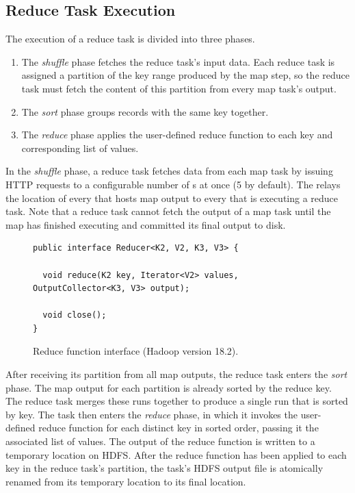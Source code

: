 \subsection{Reduce Task Execution}
\label{ch:hadoop:sec:reducetask}
The execution of a reduce task is divided into three phases.
\begin{enumerate}
\item The \emph{shuffle} phase fetches the reduce task's input
  data. Each reduce task is assigned a partition of the key range
  produced by the map step, so the reduce task must fetch the content
  of this partition from every map task's output.
\item The \emph{sort} phase groups records with the same key together.
\item The \emph{reduce} phase applies the user-defined reduce function
  to each key and corresponding list of values.
\end{enumerate}

In the \emph{shuffle} phase, a reduce task fetches data from each map task by
issuing HTTP requests to a configurable number of {\TT}s at once (5 by
default). The {\JT} relays the location of every {\TT} that hosts map output to
every {\TT} that is executing a reduce task. Note that a reduce task cannot
fetch the output of a map task until the map has finished executing and
committed its final output to disk.

\begin{figure}[t]
\ssp
\begin{minipage}{\linewidth}
\begin{verbatim}
public interface Reducer<K2, V2, K3, V3> {

  void reduce(K2 key, Iterator<V2> values, OutputCollector<K3, V3> output);

  void close();
}
\end{verbatim}

\end{minipage}
\caption{Reduce function interface (Hadoop version 18.2).}
\label{fig:reducefunction}
\end{figure}

After receiving its partition from all map outputs, the reduce task enters the
\emph{sort} phase. The map output for each partition is already sorted by the
reduce key. The reduce task merges these runs together to produce a single run
that is sorted by key. The task then enters the \emph{reduce} phase, in which it
invokes the user-defined reduce function for each distinct key in sorted order,
passing it the associated list of values. The output of the reduce function is
written to a temporary location on HDFS\@. After the reduce function has been
applied to each key in the reduce task's partition, the task's HDFS output file
is atomically renamed from its temporary location to its final location.


